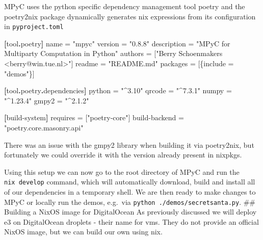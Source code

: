 \documentclass[
]{article}
\newenvironment{Shaded}{}{}
\newcommand{\DataTypeTok}[1]{\textcolor[rgb]{0.56,0.13,0.00}{#1}}
\newcommand{\KeywordTok}[1]{\textcolor[rgb]{0.00,0.44,0.13}{\textbf{#1}}}
\newcommand{\OperatorTok}[1]{\textcolor[rgb]{0.40,0.40,0.40}{#1}}
\newcommand{\StringTok}[1]{\textcolor[rgb]{0.25,0.44,0.63}{#1}}
\begin{document}
MPyC uses the python specific dependency management tool
poetry\autocite{poetryDocs} and the poetry2nix package dynamically
generates nix expressions from its configuration in
\texttt{pyproject.toml}

\begin{Shaded}
  \begin{Highlighting}[]
    \KeywordTok{[}\DataTypeTok{tool}\KeywordTok{.}\DataTypeTok{poetry}\KeywordTok{]}
    \DataTypeTok{name} \OperatorTok{=} \StringTok{"mpyc"}
    \DataTypeTok{version} \OperatorTok{=} \StringTok{"0.8.8"}
    \DataTypeTok{description} \OperatorTok{=} \StringTok{"MPyC for Multiparty Computation in Python"}
    \DataTypeTok{authors} \OperatorTok{=} \OperatorTok{[}\StringTok{"Berry Schoenmakers \textless{}berry@win.tue.nl\textgreater{}"}\OperatorTok{]}
    \DataTypeTok{readme} \OperatorTok{=} \StringTok{"README.md"}
    \DataTypeTok{packages} \OperatorTok{=} \OperatorTok{[\{}\DataTypeTok{include}\OperatorTok{ =} \StringTok{"demos"}\OperatorTok{\}]}

    \KeywordTok{[}\DataTypeTok{tool}\KeywordTok{.}\DataTypeTok{poetry}\KeywordTok{.}\DataTypeTok{dependencies}\KeywordTok{]}
    \DataTypeTok{python} \OperatorTok{=} \StringTok{"\^{}3.10"}
    \DataTypeTok{qrcode} \OperatorTok{=} \StringTok{"\^{}7.3.1"}
    \DataTypeTok{numpy} \OperatorTok{=} \StringTok{"\^{}1.23.4"}
    \DataTypeTok{gmpy2} \OperatorTok{=} \StringTok{"\^{}2.1.2"}

    \KeywordTok{[}\DataTypeTok{build{-}system}\KeywordTok{]}
    \DataTypeTok{requires} \OperatorTok{=} \OperatorTok{[}\StringTok{"poetry{-}core"}\OperatorTok{]}
    \DataTypeTok{build{-}backend} \OperatorTok{=} \StringTok{"poetry.core.masonry.api"}
  \end{Highlighting}
\end{Shaded}

There was an issue with the gmpy2 library when building it via
poetry2nix, but fortunately we could override it with the version
already present in nixpkgs.

Using this setup we can now go to the root directory of MPyC and run the
\texttt{nix\ develop} command, which will automatically download, build
and install all of our dependencies in a temporary shell. We are then
ready to make changes to MPyC or locally run the demos, e.g.~via
\texttt{python\ ./demos/secretsanta.py}. \#\# Building a NixOS image for
DigitalOcean As previously discussed we will deploy \gls{e3} on
DigitalOcean droplets - their name for \glspl{vm}. They do not provide
an official NixOS image, but we can build our own using nix.
\end{document}
